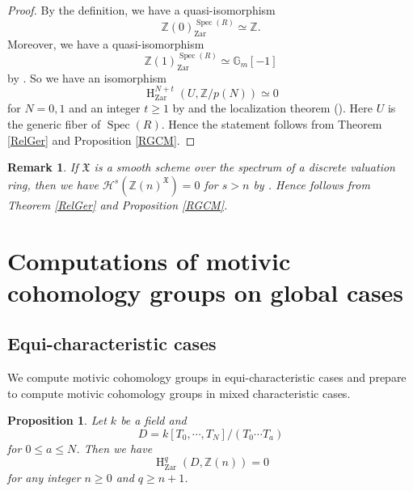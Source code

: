 \documentclass{article}
\newtheorem{prop}[thm]{\indent \sc Proposition}
\newtheorem{rem}[thm]{\indent \sc Remark}
\newcommand{\spec}{\operatorname{Spec}}
\newcommand{\Zar}{\mathrm{Zar}}
\newcommand{\HO}{\operatorname{H}}
\begin{document}
%
\begin{proof}\upshape
By the definition, we have a quasi-isomorphism
%
\begin{equation*}
\mathbb{Z}(0)_{\Zar}^{\spec(R)}
\simeq 
\mathbb{Z}.
\end{equation*}
%
Moreover, we have a quasi-isomorphism
%
\begin{equation*}
\mathbb{Z}(1)^{\spec(R)}_{\Zar} 
\simeq 
\mathbb{G}_{m}[-1]
\end{equation*}
%
by \cite[Lemma 11.2]{L}. So we have an isomorphism
%
\begin{equation*}
\HO_{\Zar}^{N+t}(
U, \mathbb{Z}/p(N)
)    
\simeq 0
\end{equation*}
%
for $N=0, 1$ and an integer $t\geq 1$ by \cite[Proposition 2.1]{Sak4} 
and the localization theorem (\cite[p.779, Theorem 3.2]{Ge}). 
Here $U$ is the generic fiber of $\spec(R)$.
Hence the statement follows from Theorem \ref{RelGer} and Proposition \ref{RGCM}.
\end{proof}
%


%
\begin{rem}\upshape
If $\mathfrak{X}$ is a smooth scheme over the spectrum of a discrete valuation ring, 
then we have
$\mathcal{H}^{s}(\mathbb{Z}(n)^{\mathfrak{X}})=0$ for $s>n$ 
by \cite[p.786, Corollary 4.4]{Ge}. Hence
\cite[Theorem 1.4]{Sak5} follows from Theorem \ref{RelGer} and Proposition \ref{RGCM}.
\end{rem}
%

%
\section{Computations of motivic cohomology groups on global cases}\label{Tcommt}

\subsection{Equi-characteristic cases}

We compute motivic cohomology groups in equi-characteristic cases and
prepare to compute motivic cohomology groups in mixed characteristic cases.

%
\begin{prop}\upshape\label{VaniNGL}
Let $k$ be a field and 
%
\begin{equation*}
D=k[T_{0}, \cdots, T_{N}]/(T_{0}\cdots T_{a})    
\end{equation*}
%
for $0\leq a\leq N$. Then we have
%
\begin{equation*}
\HO^{q}_{\Zar}(
D,
\mathbb{Z}(n)
)    
=0
\end{equation*}
%
for any integer $n\geq 0$ and $q\geq n+1$.
\end{prop}
%
\end{document}
